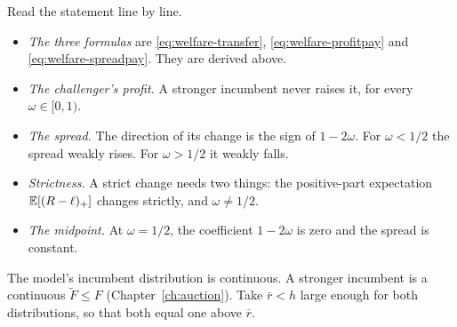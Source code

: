 Read the statement line by line.
\begin{itemize}
\item \emph{The three formulas} are \eqref{eq:welfare-transfer}, \eqref{eq:welfare-profitpay} and
\eqref{eq:welfare-spreadpay}. They are derived above.
\item \emph{The challenger's profit.} A stronger incumbent never raises it, for every \(\omega\in[0,1)\).
\item \emph{The spread.} The direction of its change is the sign of \(1-2\omega\). For \(\omega<1/2\) the spread
weakly rises. For \(\omega>1/2\) it weakly falls.
\item \emph{Strictness.} A strict change needs two things: the positive-part expectation \(\mathbb{E}[(R-\ell)_+]\) changes
strictly, and \(\omega\ne1/2\).
\item \emph{The midpoint.} At \(\omega=1/2\), the coefficient \(1-2\omega\) is zero and the spread is constant.
\end{itemize}

The model's incumbent distribution is continuous. A stronger incumbent is a continuous \(\tilde F\le F\)
(Chapter~\ref{ch:auction}). Take \(\bar r<h\) large enough for both distributions, so that both equal one above \(\bar r\).

